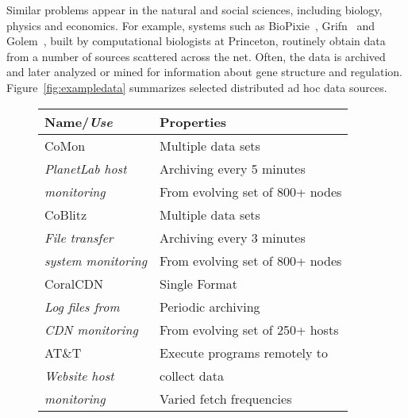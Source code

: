 Similar problems appear in the natural and social sciences,
including biology, physics and economics.  For example, systems such
as BioPixie~\cite{biopixie}, Grifn~\cite{grifn} and
Golem~\cite{golem}, built by computational biologists at Princeton,
routinely obtain data from a number of sources scattered
across the net.  Often, the data is archived and later analyzed or
mined for information about gene structure and regulation.
Figure~\ref{fig:exampledata} summarizes 
selected distributed ad hoc data sources.


\begin{figure}[t]
\begin{center}
\begin{tabular}{|l|l|}
\hline
{\small {\bf Name/{\em Use}} } & {\small  {\bf Properties}} 
\\\hline\hline
{\small CoMon~\cite{comon} } & {\small  Multiple data sets} \\
{\small {\em  PlanetLab host}              } & {\small  Archiving every 5 minutes} \\
{\small {\em  monitoring}} & {\small  From evolving set of 800+ nodes} \\\hline
{\small CoBlitz~\cite{coblitz}   } & {\small  Multiple data sets } \\
{\small {\em  File transfer}        } & {\small  Archiving every 3 minutes } \\
{\small {\em  system monitoring}                                      } & {\small  From evolving set of 800+ nodes } \\\hline
{\small CoralCDN~\cite{coral}         } & {\small  Single Format } \\
{\small {\em  Log files from}  } & {\small  Periodic archiving } \\
{\small {\em  CDN monitoring}                  } & {\small  From evolving set of 250+ hosts } \\\hline
{\small AT\&T \vizGems{}                    } & {\small  Execute programs remotely to } \\
{\small {\em  Website host}                 } & {\small  collect data } \\
{\small {\em   monitoring}                   } & {\small  Varied fetch frequencies } \\\hline

\end{tabular}
\end{center}
\end{figure}
